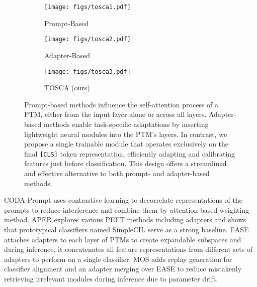 \begin{figure}[t]
\captionsetup{font=small}
  \centering
  \begin{subfigure}{0.463\textwidth}
    \texttt{[image: figs/tosca1.pdf]}
    \caption{Prompt-Based}
    \label{fig:params}
  \end{subfigure}
  \hfill
  \begin{subfigure}{0.23\textwidth}
    \texttt{[image: figs/tosca2.pdf]}
    \caption{Adapter-Based}
    \label{fig:abla_heat}
  \end{subfigure}
  \hfill
  \begin{subfigure}{0.2\textwidth}
    \texttt{[image: figs/tosca3.pdf]}
    \caption{TOSCA (ours)}
    \label{fig:abla_line}
  \end{subfigure}
\caption{Prompt-based methods influence the self-attention process of a PTM, either from the input layer alone or across all layers. Adapter-based methods enable task-specific adaptations by inserting lightweight neural modules into the PTM’s layers. In contrast, we propose a single trainable module that operates exclusively on the final \texttt{[CLS]} token representation, efficiently adapting and calibrating features just before classification. This design offers a streamlined and effective alternative to both prompt- and adapter-based methods.}
\end{figure}

CODA-Prompt \cite{codaprompt} uses contrastive learning to decorrelate representations of the prompts to reduce interference and combine them by attention-based weighting method.
APER \cite{simplecil_aper} explores various PEFT methods including adapters and shows that prototypical classifiers named SimpleCIL serve as a strong baseline. 
EASE \cite{ease} attaches adapters to each layer of PTMs to create expandable subspaces and during inference, it concatenates all feature representations from different sets of adapters to perform on a single classifier. 
MOS \cite{mos} adds replay generation for classifier alignment and an adapter merging over EASE to reduce mistakenly retrieving irrelevant modules during inference due to parameter drift. 